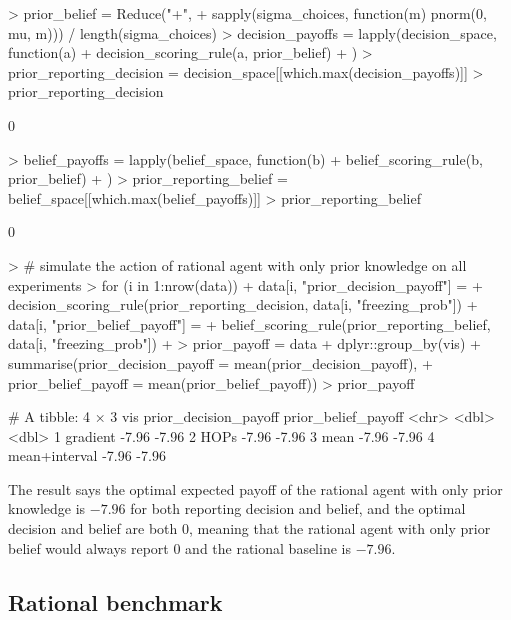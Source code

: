 \documentclass{article}
\begin{document}
\begin{Schunk}
\begin{Sinput}
> prior_belief = Reduce("+", 
+   sapply(sigma_choices, function(m) {pnorm(0, mu, m)})) / length(sigma_choices)
> decision_payoffs = lapply(decision_space, function(a) {
+   decision_scoring_rule(a, prior_belief)
+ })
> prior_reporting_decision = decision_space[[which.max(decision_payoffs)]]
> prior_reporting_decision
\end{Sinput}
\begin{Soutput}
[1] 0
\end{Soutput}
\begin{Sinput}
> belief_payoffs = lapply(belief_space, function(b) {
+   belief_scoring_rule(b, prior_belief)
+ })
> prior_reporting_belief = belief_space[[which.max(belief_payoffs)]]
> prior_reporting_belief
\end{Sinput}
\begin{Soutput}
[1] 0
\end{Soutput}
\begin{Sinput}
> # simulate the action of rational agent with only prior knowledge on all experiments
> for (i in 1:nrow(data)) {
+   data[i, "prior_decision_payoff"] = 
+     decision_scoring_rule(prior_reporting_decision, data[i, "freezing_prob"])
+   data[i, "prior_belief_payoff"] = 
+     belief_scoring_rule(prior_reporting_belief, data[i, "freezing_prob"])
+ }
> prior_payoff = data %>%
+   dplyr::group_by(vis) %>%
+   summarise(prior_decision_payoff = mean(prior_decision_payoff),
+             prior_belief_payoff = mean(prior_belief_payoff))
> prior_payoff
\end{Sinput}
\begin{Soutput}
# A tibble: 4 × 3
  vis           prior_decision_payoff prior_belief_payoff
  <chr>                         <dbl>               <dbl>
1 gradient                      -7.96               -7.96
2 HOPs                          -7.96               -7.96
3 mean                          -7.96               -7.96
4 mean+interval                 -7.96               -7.96
\end{Soutput}
\end{Schunk}

The result says the optimal expected payoff of the rational agent with only prior knowledge is $-7.96$ for both reporting decision and belief, and the optimal decision and belief are both $0$, meaning that the rational agent with only prior belief would always report $0$ and the rational baseline is $-7.96$.

\subsection{Rational benchmark}
\end{document}
